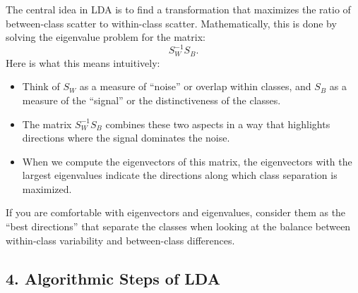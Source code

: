 \documentclass[10pt]{article}
\begin{document}
The central idea in LDA is to find a transformation that maximizes the ratio of between-class scatter to within-class scatter. Mathematically, this is done by solving the eigenvalue problem for the matrix:
\[
S_W^{-1} S_B.
\]
Here is what this means intuitively:
\begin{itemize}
    \item Think of \(S_W\) as a measure of “noise” or overlap within classes, and \(S_B\) as a measure of the “signal” or the distinctiveness of the classes.
    \item The matrix \(S_W^{-1} S_B\) combines these two aspects in a way that highlights directions where the signal dominates the noise.
    \item When we compute the eigenvectors of this matrix, the eigenvectors with the largest eigenvalues indicate the directions along which class separation is maximized.
\end{itemize}
If you are comfortable with eigenvectors and eigenvalues, consider them as the “best directions” that separate the classes when looking at the balance between within-class variability and between-class differences.

\subsection*{4. Algorithmic Steps of LDA}
\end{document}
